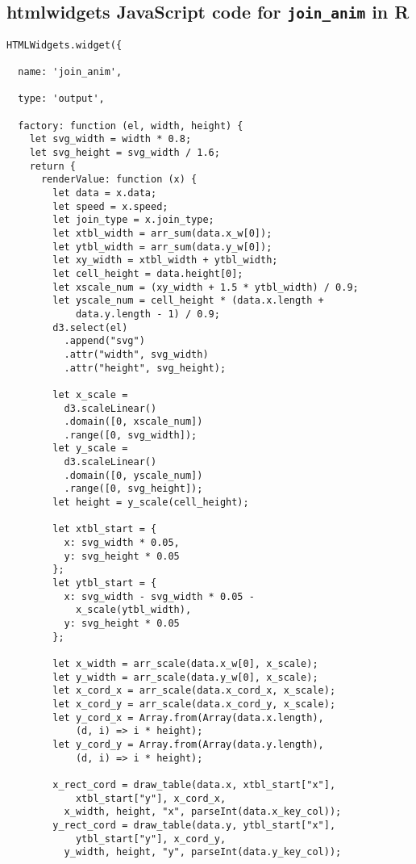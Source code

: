 \subsection{\textbf{htmlwidgets} \textsf{JavaScript} code for \texttt{join\_anim} in \textsf{R}}
\begin{lstlisting}
HTMLWidgets.widget({

  name: 'join_anim',

  type: 'output',

  factory: function (el, width, height) {
    let svg_width = width * 0.8;
    let svg_height = svg_width / 1.6;
    return {
      renderValue: function (x) {
        let data = x.data;
        let speed = x.speed;
        let join_type = x.join_type;
        let xtbl_width = arr_sum(data.x_w[0]);
        let ytbl_width = arr_sum(data.y_w[0]);
        let xy_width = xtbl_width + ytbl_width;
        let cell_height = data.height[0];
        let xscale_num = (xy_width + 1.5 * ytbl_width) / 0.9;
        let yscale_num = cell_height * (data.x.length + 
            data.y.length - 1) / 0.9;
        d3.select(el)
          .append("svg")
          .attr("width", svg_width)
          .attr("height", svg_height);

        let x_scale =
          d3.scaleLinear()
          .domain([0, xscale_num])
          .range([0, svg_width]);
        let y_scale =
          d3.scaleLinear()
          .domain([0, yscale_num])
          .range([0, svg_height]);
        let height = y_scale(cell_height);

        let xtbl_start = {
          x: svg_width * 0.05,
          y: svg_height * 0.05
        };
        let ytbl_start = {
          x: svg_width - svg_width * 0.05 - 
            x_scale(ytbl_width),
          y: svg_height * 0.05
        };

        let x_width = arr_scale(data.x_w[0], x_scale);
        let y_width = arr_scale(data.y_w[0], x_scale);
        let x_cord_x = arr_scale(data.x_cord_x, x_scale);
        let x_cord_y = arr_scale(data.x_cord_y, x_scale);
        let y_cord_x = Array.from(Array(data.x.length), 
            (d, i) => i * height);
        let y_cord_y = Array.from(Array(data.y.length), 
            (d, i) => i * height);

        x_rect_cord = draw_table(data.x, xtbl_start["x"], 
            xtbl_start["y"], x_cord_x,
          x_width, height, "x", parseInt(data.x_key_col));
        y_rect_cord = draw_table(data.y, ytbl_start["x"], 
            ytbl_start["y"], x_cord_y,
          y_width, height, "y", parseInt(data.y_key_col));


\end{lstlisting}
